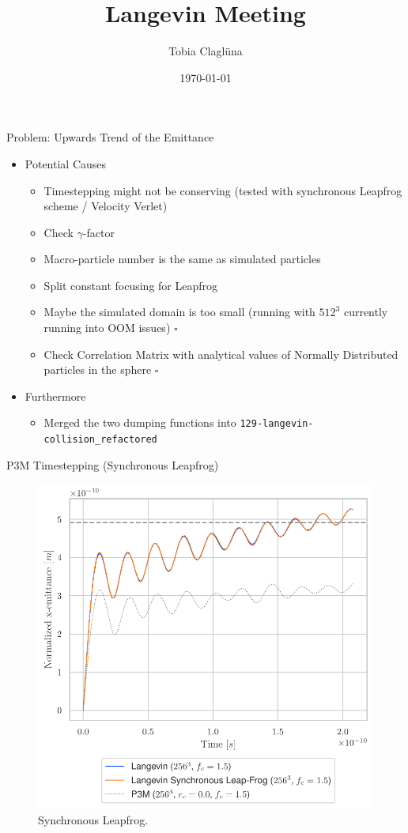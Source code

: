 
\title[\today]{Langevin Meeting}

\author{Tobia Claglüna}
\date{\today}
\def \myEmail {tobia.clagluena@psi.ch}





\begin{frame}{Problem: Upwards Trend of the Emittance}
        \begin{itemize}
            \item Potential Causes
                \begin{itemize}
                    \item Timestepping might not be conserving (tested with synchronous Leapfrog scheme / Velocity Verlet) \done
                    \item Check $\gamma$-factor \done
                    \item Macro-particle number is the same as simulated particles \done
                    \item Split constant focusing for Leapfrog \done
                    \item Maybe the simulated domain is too small (running with $512^3$ currently running into OOM issues) $\square$
                    \item Check Correlation Matrix with analytical values of Normally Distributed particles in the sphere $\square$
                \end{itemize}

            \item Furthermore
                \begin{itemize}
                    \item Merged the two dumping functions into \texttt{129-langevin-collision\_refactored}
                \end{itemize}
        \end{itemize}
\end{frame}

\begin{frame}{P3M Timestepping (Synchronous Leapfrog)}
    \begin{figure}[!htb]
      \includegraphics[width=0.6\linewidth]{figures/comparison_verlet.pdf}
        \caption{Synchronous Leapfrog.}
      \label{fig:forward_euler}
    \end{figure}
\end{frame}

